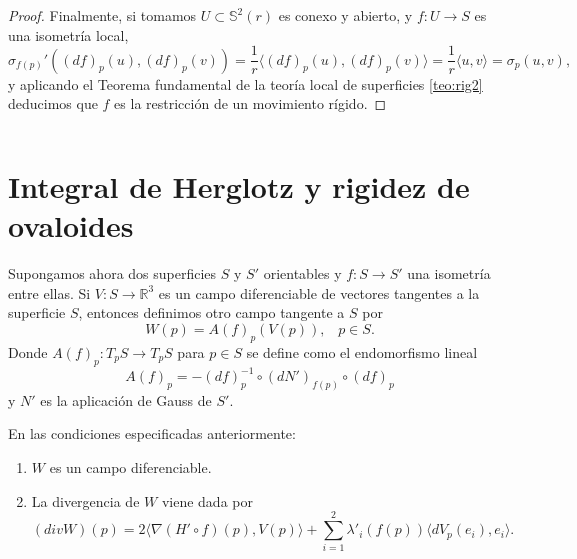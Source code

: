 \begin{proof}
	Finalmente, si tomamos $U \subset \mathbb{S}^2(r)$ es conexo y abierto, y $f: U \to  S$ es una isometría local,
	${ }$\\
	\[
		\sigma_{f(p)}'((df)_p(u), (df)_p(v)) = \frac{1}{r} \langle (df)_p(u), (df)_p(v) \rangle = \frac{1}{r} \langle u, v \rangle = \sigma_p (u,v),
	\]
	${ }$\\
	y aplicando el Teorema fundamental de la teoría local de superficies \ref{teo:rig2} deducimos que $f$ es la restricción de un movimiento rígido.
	
	
	
	
\end{proof}
	${ }$\\







	${ }$\\
\section{Integral de Herglotz y rigidez de ovaloides}
	${ }$\\
	
Supongamos ahora dos superficies $S$ y $S'$ orientables  y $f : S \to S'$ una isometría entre ellas. Si $V : S \to \mathbb{R}^3$ es un campo diferenciable de vectores tangentes a la superficie $S$, entonces definimos otro campo tangente a $S$ por
${ }$\\
\[
	W(p) = A(f)_p(V(p)), \;\;\; p \in S.
\]
${ }$\\
Donde $A(f)_p : T_p S \to T_p S$ para $p \in S$ se define como el endomorfismo lineal
${ }$\\
\[
	A(f)_p = -(df)^{-1}_{p} \circ (dN')_{f(p)} \circ (df)_p
\]
${ }$\\
y $N'$ es la aplicación de Gauss de $S'$.
${ }$\\

\begin{lema} \label{lem:lema1}
	En las condiciones especificadas anteriormente:
	\begin{enumerate}
		\item $W$ es un campo diferenciable.
		\item La divergencia de $W$ viene dada por 
		\[
			(div W)(p) = 2 \langle \nabla (H' \circ f)(p), V(p) \rangle + \sum_{i=1}^{2} \lambda'_{i}(f(p)) \langle dV_p(e_i), e_i \rangle.
		\]
	\end{enumerate}
	
\end{lema}



